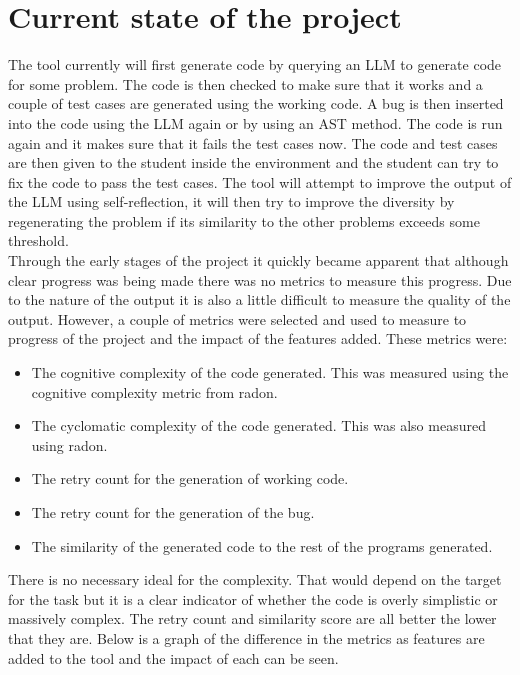 \documentclass[12pt]{extarticle}
\begin{document}
\section{Current state of the project}

The tool currently will first generate code by querying an LLM to generate code for some problem. The code is then checked to make sure that it works and a couple of test cases are generated using the working code. A bug is then inserted into the code using the LLM again or by using an AST method. The code is run again and it makes sure that it fails the test cases now. The code and test cases are then given to the student inside the environment and the student can try to fix the code to pass the test cases. The tool will attempt to improve the output of the LLM using self-reflection, it will then try to improve the diversity by regenerating the problem if its similarity to the other problems exceeds some threshold.\\
Through the early stages of the project it quickly became apparent that although clear progress was being made there was no metrics to measure this progress. Due to the nature of the output it is also a little difficult to measure the quality of the output. However, a couple of metrics were selected and used to measure to progress of the project and the impact of the features added. These metrics were:
\begin{itemize}
    \item The cognitive complexity of the code generated. This was measured using the cognitive complexity metric from radon.
    \item The cyclomatic complexity of the code generated. This was also measured using radon.
    \item The retry count for the generation of working code.
    \item The retry count for the generation of the bug.
    \item The similarity of the generated code to the rest of the programs generated.
\end{itemize}
There is no necessary ideal for the complexity. That would depend on the target for the task but it is a clear indicator of whether the code is overly simplistic or massively complex. The retry count and similarity score are all better the lower that they are. Below is a graph of the difference in the metrics as features are added to the tool and the impact of each can be seen.\\
\\
\end{document}
